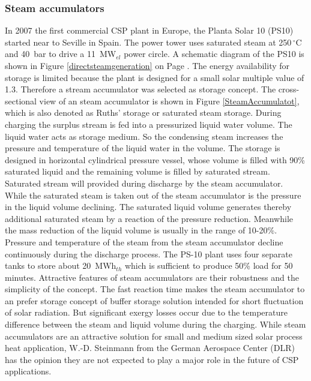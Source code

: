 \documentclass[Master,MEE,english]{twbook}%
\begin{document}
\subsubsection{Steam accumulators}
In 2007 the first commercial CSP plant in Europe, the Planta Solar 10 (PS10) started near to Seville in Spain. The power tower uses saturated steam at 250$\,^{\circ}\mathrm{C}$ and 40~bar to drive a 11~MW$_{el}$ power circle. A schematic diagram of the PS10 is shown in Figure \ref{directsteamgeneration} on Page \pageref{directsteamgeneration}. The energy availability for storage is limited because the  plant is designed for a small solar multiple value of 1.3. Therefore a stream accumulator was selected as storage concept. The cross-sectional view of an steam accumulator is shown in Figure \ref{SteamAccumulatot}, which is also denoted as Ruths' storage or saturated steam storage. During charging the surplus stream is fed into a pressurized liquid water volume. The liquid water acts as storage medium. So the condensing steam increases the pressure and temperature of the liquid water in the volume. The storage is designed in horizontal cylindrical pressure vessel, whose volume is filled with 90\% saturated liquid and the remaining volume is filled by saturated stream. Saturated stream will provided during discharge by the steam accumulator. While the saturated steam is taken out of the steam accumulator is the pressure in the liquid volume declining. The saturated liquid volume generates thereby additional saturated steam by a reaction of the pressure reduction. Meanwhile the mass reduction of the liquid volume is usually in the range of 10-20\%. Pressure and temperature of the steam from the steam accumulator decline continuously during the discharge process. The PS-10 plant uses four separate tanks to store about 20~MWh$_{th}$ which is sufficient to produce 50\% load for 50 minutes. Attractive features of steam accumulators are their robustness and the simplicity of the concept. The fast reaction time makes the steam accumulator to an prefer storage concept of buffer storage solution intended for short fluctuation of solar radiation. But significant exergy losses occur due to the temperature difference between the steam and liquid volume during the charging. While steam accumulators are an attractive solution for small and medium sized solar process heat application, W.-D. Steinmann from the German Aerospace Center (DLR) \cite{Steinmann2015} has the opinion they are not expected to play a major role in the future of CSP applications. \cite{Richter2013}\\
\end{document}
